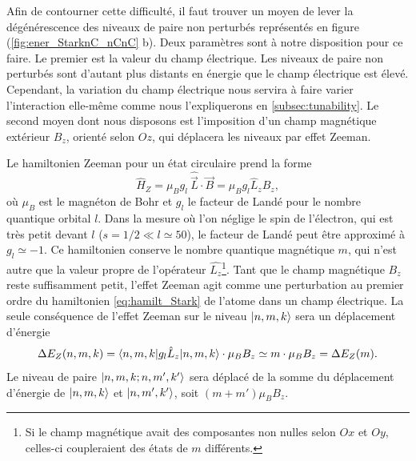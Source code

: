 Afin de contourner cette difficulté, il faut trouver un moyen de lever la dégénérescence des niveaux de paire non perturbés représentés en figure (\ref{fig:ener_StarknC_nCnC} b).
Deux paramètres sont à notre disposition pour ce faire.
Le premier est la valeur du champ électrique.
Les niveaux de paire non perturbés sont d'autant plus distants en énergie que le champ électrique est élevé.
Cependant, la variation du champ électrique nous servira à faire varier l'interaction elle-même comme nous l'expliquerons en \ref{subsec:tunability}.
Le second moyen dont nous disposons est l'imposition d'un champ magnétique extérieur $B_z$, orienté selon $Oz$, qui déplacera les niveaux par effet Zeeman.

Le hamiltonien Zeeman pour un état circulaire prend la forme%
\begin{equation}
\label{eq:H_Zeeman}
\hat{H}_Z = \mu_B g_l~\hat{\vec{L}}\cdot\vec{B} = \mu_B g_l\hat{L}_zB_z,
\end{equation}
où $\mu_B$ est le magnéton de Bohr et $g_l$ le facteur de Landé pour le nombre quantique orbital $l$.
Dans la mesure où l'on néglige le spin de l'électron, qui est très petit devant $l$ ($s=1/2 \ll l\simeq 50$), le facteur de Landé peut être approximé à $g_l \simeq -1$.
Ce hamiltonien conserve le nombre quantique magnétique $m$, qui n'est autre que la valeur propre de l'opérateur $\hat{L_z}$\footnote{
Si le champ magnétique avait des composantes non nulles selon $Ox$ et $Oy$, celles-ci coupleraient des états de $m$ différents.}.
Tant que le champ magnétique $B_z$ reste suffisamment petit, l'effet Zeeman agit comme une perturbation au premier ordre du hamiltonien \eqref{eq:hamilt_Stark} de l'atome dans un champ électrique.
La seule conséquence de l'effet Zeeman sur le niveau $\ket{n,m,k}$ sera un déplacement d'énergie
\begin{equation}
\label{eq:Zeeman_shift}
\Delta E_Z (n,m,k) = \braket{n,m,k|g_l \hat{L}_z | n,m,k}\cdot \mu_B B_z \simeq m\cdot \mu_B B_z = \Delta E_Z (m).
\end{equation}
Le niveau de paire $\ket{n,m,k ; n,m',k'}$ sera déplacé de la somme du déplacement d'énergie de $\ket{n,m,k}$ et $\ket{n,m',k'}$, soit $(m+m')\mu_B B_z$.

